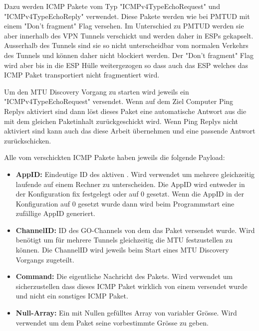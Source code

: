 Dazu werden \acs{ICMP} Pakete vom Typ "ICMPv4TypeEchoRequest" und "ICMPv4TypeEchoReply" verwendet. Diese Pakete werden wie bei \acs{PMTUD} mit einem "Don't fragment" Flag versehen. Im Unterschied zu \acs{PMTUD} werden sie aber innerhalb des \acs{VPN} Tunnels verschickt und werden daher in \acs{ESP}s gekapselt. Ausserhalb des Tunnels sind sie so nicht unterscheidbar vom normalen Verkehrs des Tunnels und können daher nicht blockiert werden. Der "Don't fragment" Flag wird aber bis in die \acs{ESP} Hülle weitergezogen so dass auch das \acs{ESP} welches das \acs{ICMP} Paket transportiert nicht fragmentiert wird.


Um den \acs{MTU} Discovery Vorgang zu starten wird jeweils ein "ICMPv4TypeEchoRequest" versendet. Wenn auf dem Ziel Computer Ping Replys aktiviert sind dann löst dieses Paket eine automatische Antwort aus die mit dem gleichen Paketinhalt zurückgeschickt wird. Wenn Ping Replys nicht aktiviert sind kann auch das \tool diese Arbeit übernehmen und eine passende Antwort zurückschicken.

Alle vom \tool verschickten \acs{ICMP} Pakete haben jeweils die folgende Payload:

\begin{itemize}
  \item \textbf{AppID:} Eindeutige ID des aktiven \tool. Wird verwendet um mehrere gleichzeitig laufende \tool auf einem Rechner zu unterscheiden. Die AppID wird entweder in der Konfiguration fix festgelegt oder auf 0 gesetzt. Wenn die AppID in der Konfiguration auf 0 gesetzt wurde dann wird beim Programmstart eine zufällige AppID generiert.
  \item \textbf{ChannelID:} ID des GO-Channels von dem das Paket versendet wurde. Wird benötigt um für mehrere Tunnels gleichzeitig die \acs{MTU} festzustellen zu können. Die ChannelID wird jeweils beim Start eines \acs{MTU} Discovery Vorgangs zugeteilt.
  \item \textbf{Command:} Die eigentliche Nachricht des Pakets. Wird verwendet um sicherzustellen dass dieses \acs{ICMP} Paket wirklich von einem \tool versendet wurde und nicht ein sonstiges \acs{ICMP} Paket.
  \item \textbf{Null-Array:} Ein mit Nullen gefülltes Array von variabler Grösse. Wird verwendet um dem Paket seine vorbestimmte Grösse zu geben.
\end{itemize}

